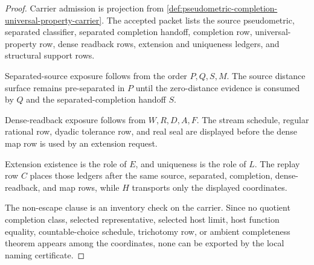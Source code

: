 \begin{proof}
Carrier admission is projection from \autoref{def:pseudometric-completion-universal-property-carrier}. The accepted packet lists the source pseudometric, separated classifier, separated completion handoff, completion row, universal-property row, dense readback rows, extension and uniqueness ledgers, and structural support rows.

Separated-source exposure follows from the order $P,Q,S,M$. The source distance surface remains pre-separated in $P$ until the zero-distance evidence is consumed by $Q$ and the separated-completion handoff $S$.

Dense-readback exposure follows from $W,R,D,A,F$. The stream schedule, regular rational row, dyadic tolerance row, and real seal are displayed before the dense map row is used by an extension request.

Extension existence is the role of $E$, and uniqueness is the role of $L$. The replay row $C$ places those ledgers after the same source, separated, completion, dense-readback, and map rows, while $H$ transports only the displayed coordinates.

The non-escape clause is an inventory check on the carrier. Since no quotient completion class, selected representative, selected host limit, host function equality, countable-choice schedule, trichotomy row, or ambient completeness theorem appears among the coordinates, none can be exported by the local naming certificate.
\end{proof}


